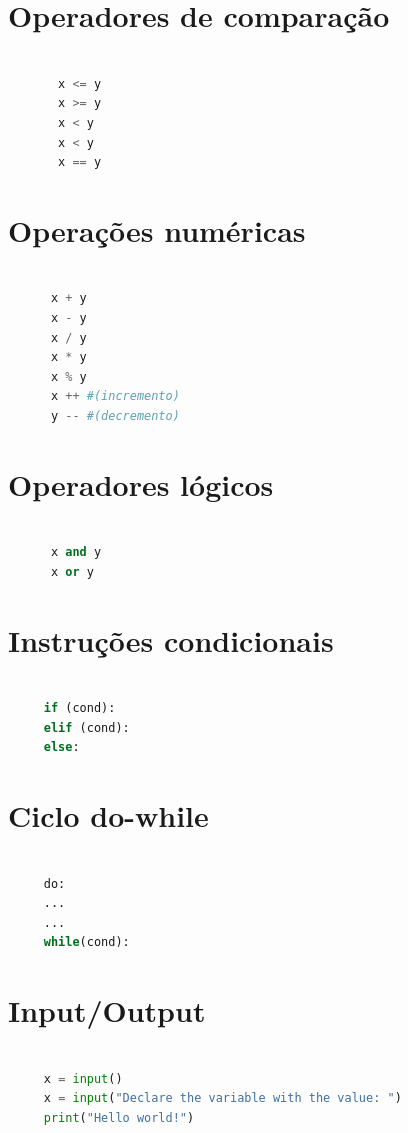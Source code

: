 \documentclass[11pt,a4paper]{report}
\begin{document}
    \section{Operadores de comparação}
    \begin{lstlisting}[language=Python]
    
       x <= y
       x >= y
       x < y
       x < y
       x == y
    \end{lstlisting}
    \section{Operações numéricas}
    \begin{lstlisting}[language=Python]
    
      x + y
      x - y
      x / y
      x * y
      x % y
      x ++ #(incremento)
      y -- #(decremento)
    \end{lstlisting}
      \section{Operadores lógicos}
    \begin{lstlisting}[language=Python]
    
      x and y
      x or y
    \end{lstlisting}
    \section{Instruções condicionais}
    \begin{lstlisting}[language=Python]
    
     if (cond):
     elif (cond):
     else:
     \end{lstlisting}
     \section{Ciclo do-while}
     \begin{lstlisting}[language=Python]
    
     do:
     ...
     ...
     while(cond):
     \end{lstlisting}
    \section{Input/Output}
    \begin{lstlisting}[language=Python]
    
     x = input()
     x = input("Declare the variable with the value: ")
     print("Hello world!")
     \end{lstlisting}
\end{document}
